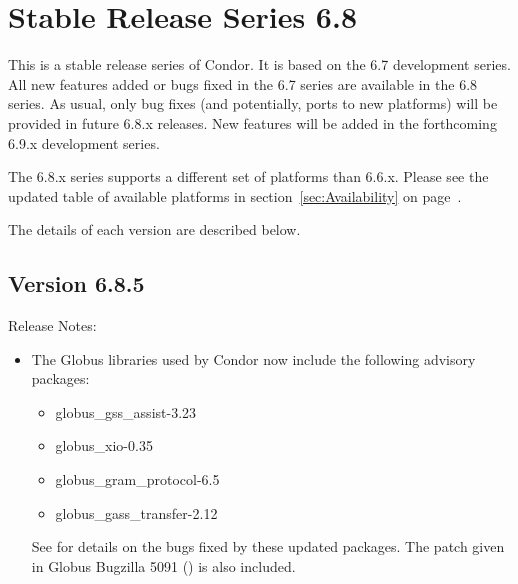 
\section{\label{sec:History-6-8}Stable Release Series 6.8}

This is a stable release series of Condor.
It is based on the 6.7 development series.
All new features added or bugs fixed in the 6.7 series are available
in the 6.8 series.
As usual, only bug fixes (and potentially, ports to new platforms)
will be provided in future 6.8.x releases.
New features will be added in the forthcoming 6.9.x development series.


The 6.8.x series supports a different set of platforms than 6.6.x.
Please see the updated table of available platforms in
section~\ref{sec:Availability} on page~\pageref{sec:Availability}.

The details of each version are described below.

\subsection*{\label{sec:New-6-8-5}Version 6.8.5}

\noindent Release Notes:

\begin{itemize}

\item The Globus libraries used by Condor now include the following advisory
packages:
  \begin{itemize}
  \item globus\_gss\_assist-3.23
  \item globus\_xio-0.35
  \item globus\_gram\_protocol-6.5
  \item globus\_gass\_transfer-2.12
  \end{itemize}
See  for details on the
bugs fixed by these updated packages.
The patch given in Globus Bugzilla 5091
() is also
included.

\end{itemize}


